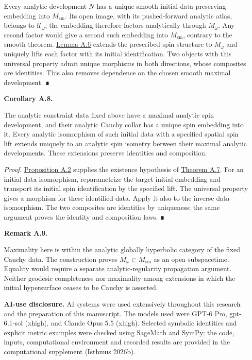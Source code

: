 \documentclass[
  english,
  11pt,
  reqno]{amsart}
\makeatletter
\newcommand{\pandocstatementheading}[1]{%
  \par\addpenalty{\@beginparpenalty}%
  \addvspace{.5\baselineskip plus .2\baselineskip minus .2\baselineskip}%
  {\normalfont\bfseries #1\par}%
  \nobreak\@afterindenttrue\@afterheading
}
\makeatother
\begin{document}
Every analytic development \(N\) has a unique smooth
initial-data-preserving embedding into \(M_{\mathrm{sm}}\). Its open
image, with its pushed-forward analytic atlas, belongs to
\(\mathscr U_\omega\); the embedding therefore factors analytically
through \(M_\omega\). Any second factor would give a second such
embedding into \(M_{\mathrm{sm}}\), contrary to the smooth theorem.
\hyperref[lem:relative-spin-extension-v2]{Lemma A.6} extends the
prescribed spin structure to \(M_\omega\) and uniquely lifts each factor
with its initial identification. Two objects with this universal
property admit unique morphisms in both directions, whose composites are
identities. This also removes dependence on the chosen smooth maximal
development. ∎

\pandocstatementheading{\protect{}\label{cor:analytic-cauchy-naturality-v08}Corollary A.8.}

The analytic constraint data fixed above have a maximal analytic spin
development, and their analytic Cauchy collar has a unique spin
embedding into it. Every analytic isomorphism of such initial data with
a specified spatial spin lift extends uniquely to an analytic spin
isometry between their maximal analytic developments. These extensions
preserve identities and composition.

\emph{Proof.}
\hyperref[prop:ordinary-analytic-cauchy-collar-v08]{Proposition A.2}
supplies the existence hypothesis of
\hyperref[thm:maximal-analytic-development-v2]{Theorem A.7}. For an
initial-data isomorphism, reparametrize the target initial embedding and
transport its initial spin identification by the specified lift. The
universal property gives a morphism for these identified data. Apply it
also to the inverse data isomorphism. The two composites are identities
by uniqueness; the same argument proves the identity and composition
laws. ∎

\pandocstatementheading{\protect{}\label{rem:analytic-maximality-scope}Remark A.9.}

Maximality here is within the analytic globally hyperbolic category of
the fixed Cauchy data. The construction proves
\(M_\omega\subset M_{\mathrm{sm}}\) as an open subspacetime. Equality
would require a separate analytic-regularity propagation argument.
Neither geodesic completeness nor maximality among extensions in which
the initial hypersurface ceases to be Cauchy is asserted.

\textbf{AI-use disclosure.} AI systems were used extensively throughout
this research and the preparation of this manuscript. The models used
were GPT-6 Pro, gpt-6.1-sol (xhigh), and Claude Opus 5.5 (xhigh).
Selected symbolic identities and explicit metric examples were checked
using SageMath and SymPy; the code, inputs, computational environment
and recorded results are provided in the computational supplement
(Isthmus 2026b).
\end{document}
